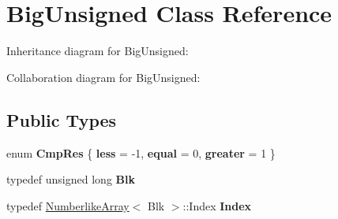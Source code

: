 \hypertarget{class_big_unsigned}{}\section{Big\+Unsigned Class Reference}
\label{class_big_unsigned}


Inheritance diagram for Big\+Unsigned\+:


Collaboration diagram for Big\+Unsigned\+:
\subsection*{Public Types}
\begin{DoxyCompactItemize}
\item 
\mbox{\label{class_big_unsigned_a1e3ef66473b8bccb9af0b555be7a0710}} 
enum {\bfseries Cmp\+Res} \{ {\bfseries less} = -\/1, 
{\bfseries equal} = 0, 
{\bfseries greater} = 1
 \}
\item 
\mbox{\label{class_big_unsigned_a100302c62ee708432c81de0a961c319b}} 
typedef unsigned long {\bfseries Blk}
\item 
\mbox{\label{class_big_unsigned_aed8ad0984c6a9286a04cff3431e34509}} 
typedef \mbox{\hyperlink{class_numberlike_array}{Numberlike\+Array}}$<$ Blk $>$\+::Index {\bfseries Index}
\end{DoxyCompactItemize}
